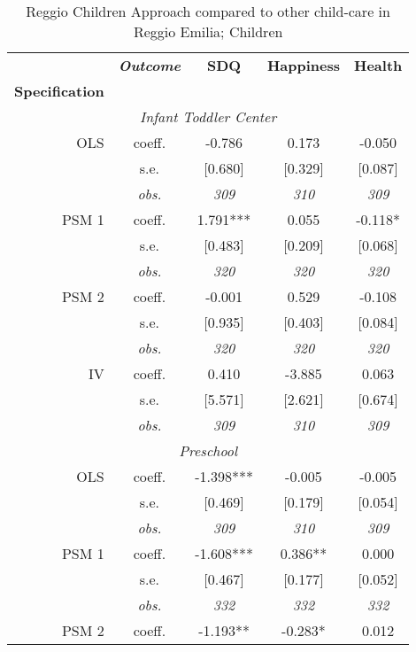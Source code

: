 \begin{table}[H] 
\caption{Reggio Children Approach compared to other child-care in Reggio Emilia; Children}
\label{tab:resultsChild-reggio}
 \begin{centering} 
\vspace{1ex}
\begin{tabular}{ r c ccc} 
\hline \hline 
 & \textbf{\textit{Outcome}} & \textbf{SDQ}  & \textbf{Happiness} & \textbf{Health}  \\ 
\textbf{Specification}  &  &  &  &  \\ 
\hline 
\multicolumn{5}{c}{\textit{Infant Toddler Center }} \\ 
\hline 

OLS	 & coeff.	 & -0.786	 & 0.173	 & -0.050	\\
	 & s.e.	 & [0.680]	 & [0.329]	 & [0.087]	\\
	 & \textit{obs.}	 & \textit{309}	 & \textit{310}	 & \textit{309}	\\
PSM 1	 & coeff.	 & 1.791***	 & 0.055	 & -0.118*	\\
	 & s.e.	 & [0.483]	 & [0.209]	 & [0.068]	\\
	 & \textit{obs.}	 & \textit{320}	 & \textit{320}	 & \textit{320}	\\
PSM 2	 & coeff.	 & -0.001	 & 0.529	 & -0.108	\\
	 & s.e.	 & [0.935]	 & [0.403]	 & [0.084]	\\
	 & \textit{obs.}	 & \textit{320}	 & \textit{320}	 & \textit{320}	\\
IV	 & coeff.	 & 0.410	 & -3.885	 & 0.063	\\
	 & s.e.	 & [5.571]	 & [2.621]	 & [0.674]	\\
	 & \textit{obs.}	 & \textit{309}	 & \textit{310}	 & \textit{309}	\\
\hline \multicolumn{5}{c}{\textit{Preschool }} \\ \hline
OLS	 & coeff.	 & -1.398***	 & -0.005	 & -0.005	\\
	 & s.e.	 & [0.469]	 & [0.179]	 & [0.054]	\\
	 & \textit{obs.}	 & \textit{309}	 & \textit{310}	 & \textit{309}	\\
PSM 1	 & coeff.	 & -1.608***	 & 0.386**	 & 0.000	\\
	 & s.e.	 & [0.467]	 & [0.177]	 & [0.052]	\\
	 & \textit{obs.}	 & \textit{332}	 & \textit{332}	 & \textit{332}	\\
PSM 2	 & coeff.	 & -1.193**	 & -0.283*	 & 0.012	\\

\end{tabular}
\end{centering}
\end{table}
